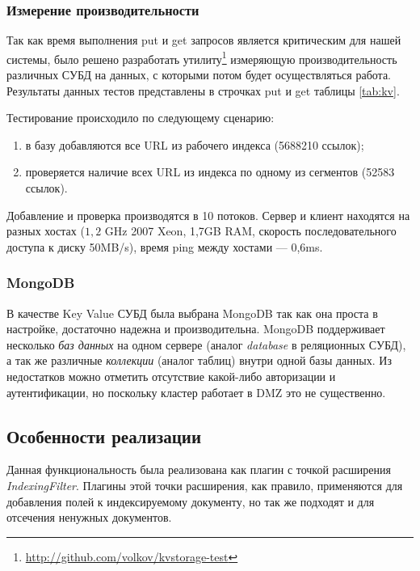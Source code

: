 \subsubsection{Измерение производительности}
Так как время выполнения put и get запросов является критическим для нашей системы, было решено разработать утилиту\footnote{\href{http://github.com/volkov/kvstorage-test}{http://github.com/volkov/kvstorage-test}} измеряющую производительность различных СУБД на данных, с которыми потом будет осуществляться работа. Результаты данных тестов представлены в строчках put и get таблицы \ref{tab:kv}.

Тестирование происходило по следующему сценарию:
\begin{enumerate}
 \item в базу добавляются все URL из рабочего индекса (5688210 ссылок);
 \item проверяется наличие всех URL из индекса по одному из сегментов (52583 ссылок).
\end{enumerate}
Добавление и проверка производятся в 10 потоков. Сервер и клиент находятся на разных хостах ($1,2$ GHz 2007 Xeon, 1,7GB RAM, скорость последовательного доступа к диску 50MB/s), время ping между хостами --- 0,6ms.
\subsubsection{MongoDB}
В качестве Key Value СУБД была выбрана MongoDB так как она проста в настройке, достаточно надежна и производительна. MongoDB поддерживает несколько \textit{баз данных} на одном сервере (аналог \textit{database} в реляционных СУБД), а так же различные \textit{коллекции} (аналог таблиц) внутри одной базы данных. Из недостатков можно отметить отсутствие какой-либо авторизации и аутентификации, но поскольку кластер работает в DMZ это не существенно.                                                                                                                                                                                                                                                                                        
\subsection{Особенности реализации}
Данная функциональность была реализована как плагин с точкой расширения \textit{IndexingFilter}. Плагины этой точки расширения, как правило, применяются для добавления полей к индексируемому документу, но так же подходят и для отсечения ненужных документов.

